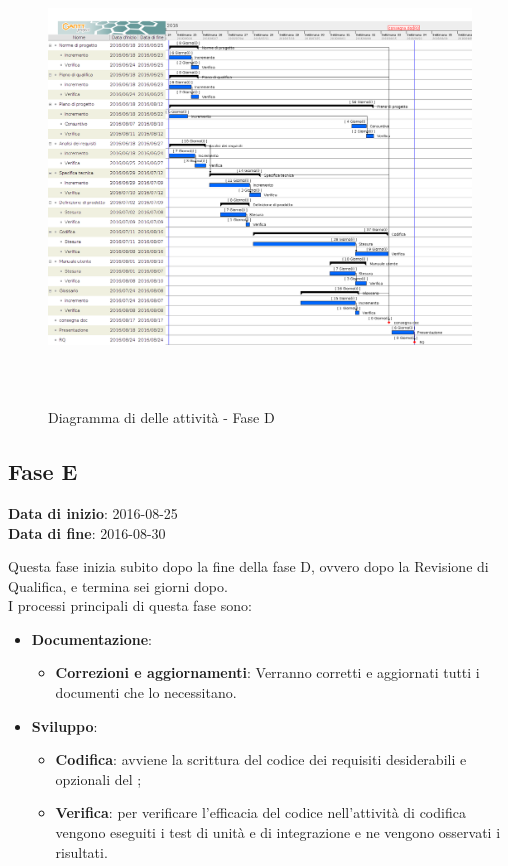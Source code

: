 		\begin{figure}[!h]
			\centering
			\includegraphics[height=12cm, width=15cm]{img/gantt/PDC} 
			\caption{Diagramma di  delle attività - Fase D}
		\end{figure}
		
	\subsection{Fase E}
	\begin{center}
		\textbf{Data di inizio}: 2016-08-25 \\
		\textbf{Data di fine}: 2016-08-30 \\
	\end{center}
	Questa fase inizia subito dopo la fine della fase D, ovvero dopo la Revisione di Qualifica, e termina sei giorni dopo. \\
	I processi principali di questa fase sono: 
		\begin{itemize}
			\item \textbf{Documentazione}:
			\att
			\begin{itemize}
				\item \textbf{Correzioni e aggiornamenti}: Verranno corretti e aggiornati tutti i documenti che lo necessitano. 
			\end{itemize}
			\item \textbf{Sviluppo}:
			\att
			\begin{itemize}
				\item \textbf{Codifica}: avviene la scrittura del codice dei requisiti desiderabili e opzionali del ;
				\item \textbf{Verifica}: per verificare l'efficacia del codice  nell'attività di codifica vengono eseguiti i test di unità e di integrazione e ne vengono osservati i risultati. 
			\end{itemize}
		\end{itemize}
